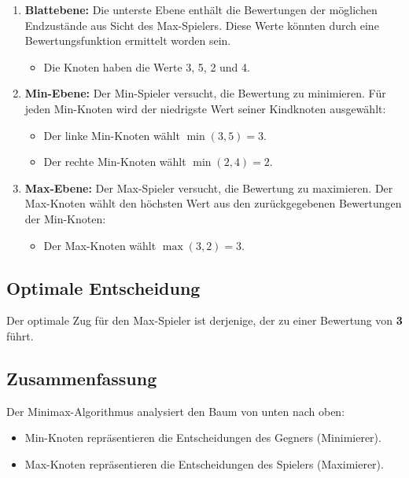 \begin{enumerate}
	\item \textbf{Blattebene:} Die unterste Ebene enthält die Bewertungen der möglichen Endzustände aus Sicht des Max-Spielers. Diese Werte könnten durch eine Bewertungsfunktion ermittelt worden sein.
	\begin{itemize}
		\item Die Knoten haben die Werte 3, 5, 2 und 4.
	\end{itemize}
	
	\item \textbf{Min-Ebene:} Der Min-Spieler versucht, die Bewertung zu minimieren. Für jeden Min-Knoten wird der niedrigste Wert seiner Kindknoten ausgewählt:
	\begin{itemize}
		\item Der linke Min-Knoten wählt $\min(3, 5) = 3$.
		\item Der rechte Min-Knoten wählt $\min(2, 4) = 2$.
	\end{itemize}
	
	\item \textbf{Max-Ebene:} Der Max-Spieler versucht, die Bewertung zu maximieren. Der Max-Knoten wählt den höchsten Wert aus den zurückgegebenen Bewertungen der Min-Knoten:
	\begin{itemize}
		\item Der Max-Knoten wählt $\max(3, 2) = 3$.
	\end{itemize}
\end{enumerate}

\subsection*{Optimale Entscheidung}

Der optimale Zug für den Max-Spieler ist derjenige, der zu einer Bewertung von \textbf{3} führt.

\subsection*{Zusammenfassung}

Der Minimax-Algorithmus analysiert den Baum von unten nach oben:
\begin{itemize}
	\item Min-Knoten repräsentieren die Entscheidungen des Gegners (Minimierer).
	\item Max-Knoten repräsentieren die Entscheidungen des Spielers (Maximierer).
\end{itemize}

